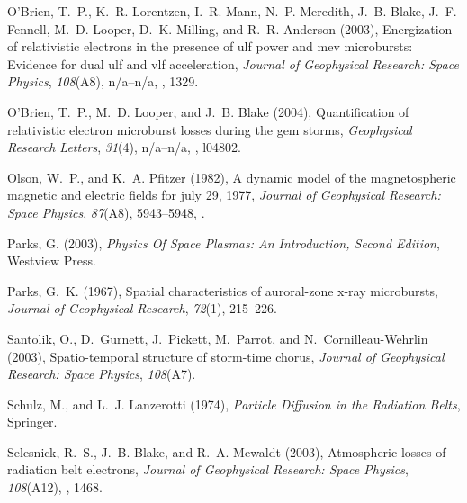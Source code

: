 \documentclass[draft, linenumbers]{agujournal}
\begin{document}
\begin{thebibliography}{49}
O'Brien, T.~P., K.~R. Lorentzen, I.~R. Mann, N.~P. Meredith, J.~B. Blake, J.~F.
  Fennell, M.~D. Looper, D.~K. Milling, and R.~R. Anderson (2003), Energization
  of relativistic electrons in the presence of ulf power and mev microbursts:
  Evidence for dual ulf and vlf acceleration, \textit{Journal of Geophysical
  Research: Space Physics}, \textit{108}(A8), n/a--n/a,
  , 1329.

O'Brien, T.~P., M.~D. Looper, and J.~B. Blake (2004), Quantification of
  relativistic electron microburst losses during the gem storms,
  \textit{Geophysical Research Letters}, \textit{31}(4), n/a--n/a,
  , l04802.

Olson, W.~P., and K.~A. Pfitzer (1982), A dynamic model of the magnetospheric
  magnetic and electric fields for july 29, 1977, \textit{Journal of
  Geophysical Research: Space Physics}, \textit{87}(A8), 5943--5948,
  .

Parks, G. (2003), \textit{Physics Of Space Plasmas: An Introduction, Second
  Edition}, Westview Press.

Parks, G.~K. (1967), Spatial characteristics of auroral-zone x-ray microbursts,
  \textit{Journal of Geophysical Research}, \textit{72}(1), 215--226.

Santolik, O., D.~Gurnett, J.~Pickett, M.~Parrot, and N.~Cornilleau-Wehrlin
  (2003), Spatio-temporal structure of storm-time chorus, \textit{Journal of
  Geophysical Research: Space Physics}, \textit{108}(A7).

Schulz, M., and L.~J. Lanzerotti (1974), \textit{Particle Diffusion in the
  Radiation Belts}, Springer.

Selesnick, R.~S., J.~B. Blake, and R.~A. Mewaldt (2003), Atmospheric losses of
  radiation belt electrons, \textit{Journal of Geophysical Research: Space
  Physics}, \textit{108}(A12), , 1468.


\end{thebibliography}
\end{document}
